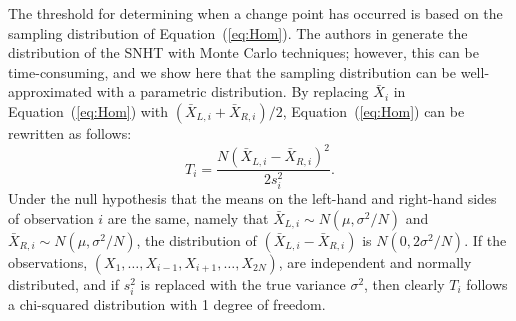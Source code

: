 \documentclass[12pt]{article}
\begin{document}
\begin{doublespacing}
The threshold for determining when a change point has occurred is based on the sampling distribution of Equation~(\ref{eq:Hom}).  The authors in \cite{haimberger07, alexandersson86,khaliq07} generate the distribution of the SNHT with Monte Carlo techniques; however, this can be time-consuming, and we show here that the sampling distribution can be well-approximated with a parametric distribution. By replacing $\bar X_i$ in Equation~(\ref{eq:Hom}) with $(\bar{X}_{L,i}+\bar{X}_{R,i})/2$,  Equation~(\ref{eq:Hom})  can be rewritten as follows:
\begin{equation*}
T_i= \frac{N\left( \bar{X}_{L,i}-\bar{X}_{R,i}\right)^2}{2s_i^2}.
\end{equation*}
Under the null hypothesis that the means on the left-hand and right-hand sides of observation $i$ are the same, namely that $\bar X_{L,i}\sim N(\mu, \sigma^2/N)$ and  $\bar X_{R,i}\sim N(\mu, \sigma^2/N)$, the distribution of $(\bar{X}_{L,i}-\bar{X}_{R,i})$ is $N(0,2\sigma^2/N)$.  If the observations, $(X_1, \ldots, X_{i-1}, X_{i+1},\ldots,X_{2N})$, are independent and normally distributed, and if $s_i^2$ is replaced with the true variance $\sigma^2$, then clearly $T_i$ follows a chi-squared distribution with 1 degree of freedom. %




\end{doublespacing}
\end{document}
